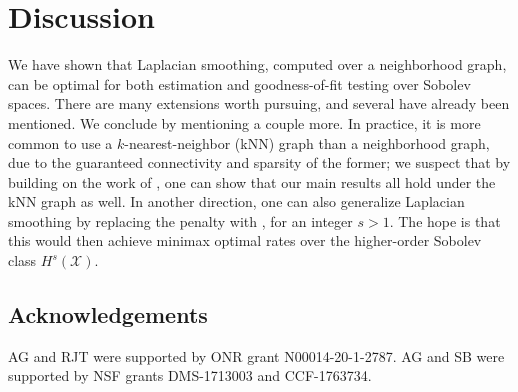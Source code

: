 \documentclass[twoside]{article}
\newcommand{\red}[1]{\textcolor{red}{#1}}
\newcommand{\green}[1]{\textcolor{green}{#1}}
\newcommand{\sbcomment}[1]{{\bf{{\red{{SB --- #1}}}}}}
\newcommand{\agcomment}[1]{{\bf{{\green{{AG --- #1}}}}}}
\newcommand{\1}{\mathbf{1}}
\newcommand{\Xset}{\mathcal{X}}
\theoremstyle{definition}
\theoremstyle{remark}
\begin{document}
\section{Discussion}
\label{sec:discussion}

We have shown that Laplacian smoothing, computed over a neighborhood graph, can be optimal for both estimation and goodness-of-fit testing over Sobolev spaces. There are many extensions worth pursuing, and several have already been mentioned. We conclude by mentioning a couple more. In practice, it is more common to use a $k$-nearest-neighbor (kNN) graph than a neighborhood graph, due to the guaranteed connectivity and sparsity of the former; we suspect that by building on the work of \citet{calder2019}, one can show that our main results all hold under the kNN graph as well. In another direction, one can also generalize Laplacian smoothing by replacing the penalty  with , for an integer $s > 1$. The hope is that this would then achieve minimax optimal rates over the higher-order Sobolev class $H^s(\Xset)$. %

\subsection*{Acknowledgements}
AG and RJT were supported by ONR grant N00014-20-1-2787. AG and SB were supported by NSF grants DMS-1713003 and CCF-1763734.


 

\appendix


\end{document}
